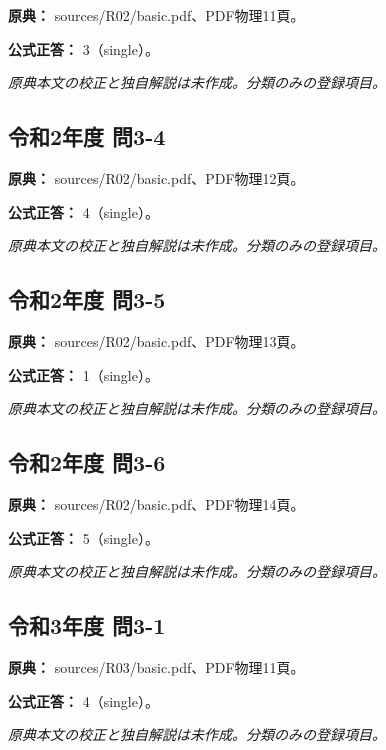 \noindent\textbf{原典：} sources/R02/basic.pdf、PDF物理11頁。

\textbf{公式正答：} 3（single）。

\par\textit{原典本文の校正と独自解説は未作成。分類のみの登録項目。}

\subsection{令和2年度 問3-4}
\label{q:r02-reg-basic-3-4}

\noindent\textbf{原典：} sources/R02/basic.pdf、PDF物理12頁。

\textbf{公式正答：} 4（single）。

\par\textit{原典本文の校正と独自解説は未作成。分類のみの登録項目。}

\subsection{令和2年度 問3-5}
\label{q:r02-reg-basic-3-5}

\noindent\textbf{原典：} sources/R02/basic.pdf、PDF物理13頁。

\textbf{公式正答：} 1（single）。

\par\textit{原典本文の校正と独自解説は未作成。分類のみの登録項目。}

\subsection{令和2年度 問3-6}
\label{q:r02-reg-basic-3-6}

\noindent\textbf{原典：} sources/R02/basic.pdf、PDF物理14頁。

\textbf{公式正答：} 5（single）。

\par\textit{原典本文の校正と独自解説は未作成。分類のみの登録項目。}

\subsection{令和3年度 問3-1}
\label{q:r03-reg-basic-3-1}

\noindent\textbf{原典：} sources/R03/basic.pdf、PDF物理11頁。

\textbf{公式正答：} 4（single）。

\par\textit{原典本文の校正と独自解説は未作成。分類のみの登録項目。}


